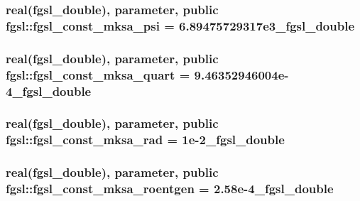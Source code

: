 \hypertarget{classfgsl_af1bb05c944f3cc7eca8c2ffb562c1cfe}{
\subsubsection[{fgsl\-\_\-const\-\_\-mksa\-\_\-psi}]{\setlength{\rightskip}{0pt plus 5cm}real({\bf fgsl\-\_\-double}), parameter, public fgsl\-::fgsl\-\_\-const\-\_\-mksa\-\_\-psi = 6.\-89475729317e3\-\_\-fgsl\-\_\-double}}\label{classfgsl_af1bb05c944f3cc7eca8c2ffb562c1cfe}
\hypertarget{classfgsl_a30b92280c9a587dcda6d603b6c737fc3}{
\subsubsection[{fgsl\-\_\-const\-\_\-mksa\-\_\-quart}]{\setlength{\rightskip}{0pt plus 5cm}real({\bf fgsl\-\_\-double}), parameter, public fgsl\-::fgsl\-\_\-const\-\_\-mksa\-\_\-quart = 9.\-46352946004e-\/4\-\_\-fgsl\-\_\-double}}\label{classfgsl_a30b92280c9a587dcda6d603b6c737fc3}
\hypertarget{classfgsl_a46fbda29caeb0f9c75253f461d340353}{
\subsubsection[{fgsl\-\_\-const\-\_\-mksa\-\_\-rad}]{\setlength{\rightskip}{0pt plus 5cm}real({\bf fgsl\-\_\-double}), parameter, public fgsl\-::fgsl\-\_\-const\-\_\-mksa\-\_\-rad = 1e-\/2\-\_\-fgsl\-\_\-double}}\label{classfgsl_a46fbda29caeb0f9c75253f461d340353}
\hypertarget{classfgsl_a0b3f21e2d3493c6d7662dbe77ab1fbe6}{
\subsubsection[{fgsl\-\_\-const\-\_\-mksa\-\_\-roentgen}]{\setlength{\rightskip}{0pt plus 5cm}real({\bf fgsl\-\_\-double}), parameter, public fgsl\-::fgsl\-\_\-const\-\_\-mksa\-\_\-roentgen = 2.\-58e-\/4\-\_\-fgsl\-\_\-double}}\label{classfgsl_a0b3f21e2d3493c6d7662dbe77ab1fbe6}
